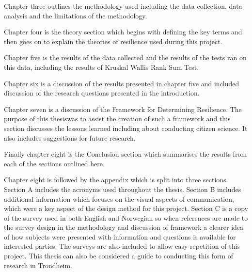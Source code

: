 Chapter three outlines the methodology used including the data collection, data analysis and the limitations of the methodology.

Chapter four is the theory section which begins with defining the key terms and then goes on to explain the theories of resilience used during this project.

Chapter five is the results of the data collected and the results of the tests ran on this data, including the results of Kruskal Wallis Rank Sum Test. 

Chapter six is a discussion of the results presented in chapter five and included discussion of the research questions presented in the introduction. 

Chapter seven is a discussion of the Framework for Determining Resilience. The purpose of this thesiswas to assist the creation of such a framework and this section discusses the lessons learned including about conducting citizen science. It also includes suggestions for future research.

Finally chapter eight is the Conclusion section which summarises the results from each of the sections outlined here.

Chapter eight is followed by the appendix which is split into three sections. Section A includes the acronyms used throughout the thesis. Section B includes additional information which focuses on the visual aspects of communication, which were a key aspect of the design method for this project. Section C is a copy of the survey used in both English and Norwegian so when references are made to the survey design in the methodology and  discussion of framework a clearer idea of how subjects were presented with information and questions is available for interested parties. The surveys are also included to allow easy repetition of this project. This thesis can also be considered a guide to conducting this form of research in Trondheim. 
